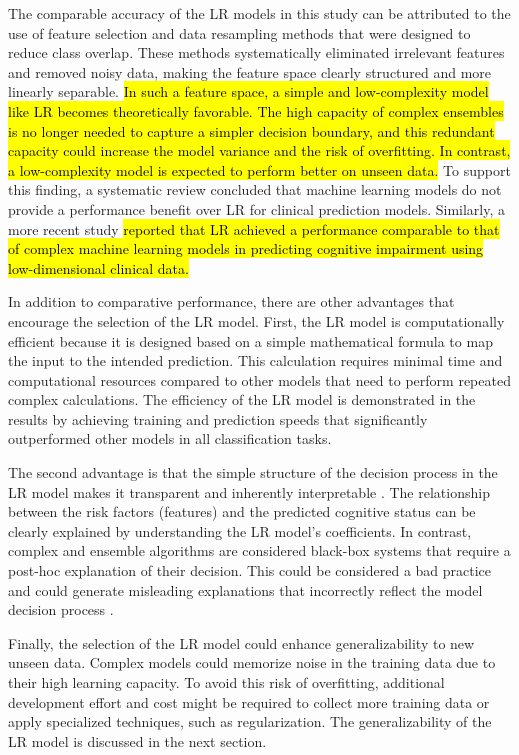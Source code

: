 The comparable accuracy of the LR models in this study can be attributed to the use of feature selection and data resampling methods that were designed to reduce class overlap. These methods systematically eliminated irrelevant features and removed noisy data, making the feature space clearly structured and more linearly separable. \hl{In such a feature space, a simple and low-complexity model like LR becomes theoretically favorable. The high capacity of complex ensembles is no longer needed to capture a simpler decision boundary, and this redundant capacity could increase the model variance and the risk of overfitting. In contrast, a low-complexity model is expected to perform better on unseen data.} To support this finding, a systematic review \cite{Christodoulou2019systematic} concluded that machine learning models do not provide a performance benefit over LR for clinical prediction models. Similarly, a more recent study \cite{Wu2023Logistic} \hl{reported that LR achieved a performance comparable to that of complex machine learning models in predicting cognitive impairment using low-dimensional clinical data.}

In addition to comparative performance, there are other advantages that encourage the selection of the LR model. First, the LR model is computationally efficient because it is designed based on a simple mathematical formula to map the input to the intended prediction. This calculation requires minimal time and computational resources compared to other models that need to perform repeated complex calculations. The efficiency of the LR model is demonstrated in the results by achieving training and prediction speeds that significantly outperformed other models in all classification tasks. 

The second advantage is that the simple structure of the decision process in the LR model makes it transparent and inherently interpretable \cite{Rudin2019Stop}. The relationship between the risk factors (features) and the predicted cognitive status can be clearly explained by understanding the LR model's coefficients. In contrast, complex and ensemble algorithms are considered black-box systems that require a post-hoc explanation of their decision. This could be considered a bad practice and could generate misleading explanations that incorrectly reflect the model decision process \cite{Rudin2019Stop}.

Finally, the selection of the LR model could enhance generalizability to new unseen data. Complex models could memorize noise in the training data due to their high learning capacity. To avoid this risk of overfitting, additional development effort and cost might be required to collect more training data or apply specialized techniques, such as regularization. The generalizability of the LR model is discussed in the next section.

